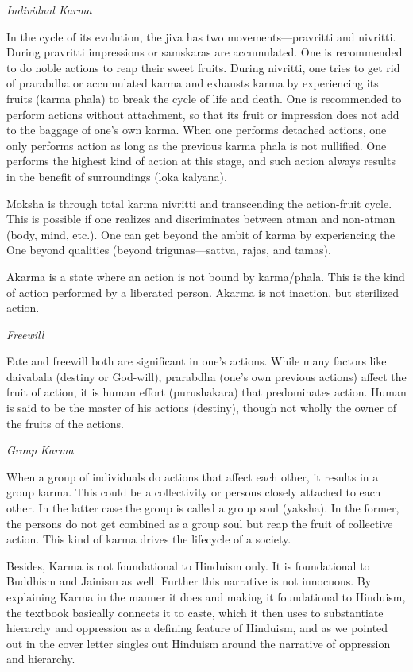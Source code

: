 \noindent
\textit{Individual Karma} 

In the cycle of its evolution, the jiva has two movements—pravritti and nivritti. During pravritti impressions or samskaras are accumulated. One is recommended to do noble actions to reap their sweet fruits. During nivritti, one tries to get rid of prarabdha or accumulated karma and exhausts karma by experiencing its fruits (karma phala) to break the cycle of life and death. One is recommended to perform actions without attachment, so that its fruit or impression does not add to the baggage of one's own karma. When one performs detached actions, one only performs action as long as the previous karma phala is not nullified. One performs the highest kind of action at this stage, and such action always results in the benefit of surroundings (loka kalyana). 

Moksha is through total karma nivritti and transcending the action-fruit cycle. This is possible if one realizes and discriminates between atman and non-atman (body, mind, etc.). One can get beyond the ambit of karma by experiencing the One beyond qualities (beyond trigunas—sattva, rajas, and tamas).

Akarma is a state where an action is not bound by karma/phala. This is the kind of action performed by a liberated person. Akarma is not inaction, but sterilized action.

\noindent
\textit{Freewill} 

Fate and freewill both are significant in one's actions. While many factors like daivabala (destiny or God-will), prarabdha (one's own previous actions) affect the fruit of action, it is human effort (purushakara) that predominates action. Human is said to be the master of his actions (destiny), though not wholly the owner of the fruits of the actions.

\noindent
\textit{Group Karma} 

When a group of individuals do actions that affect each other, it results in a group karma. This could be a collectivity or persons closely attached to each other. In the latter case the group is called a group soul (yaksha). In the former, the persons do not get combined as a group soul but reap the fruit of collective action. This kind of karma drives the lifecycle of a society.

Besides, Karma is not foundational to Hinduism only. It is foundational to Buddhism and Jainism as well. Further this narrative is not innocuous. By explaining Karma in the manner it does and making it foundational to Hinduism, the textbook basically connects it to caste, which it then uses to substantiate hierarchy and oppression as a defining feature of Hinduism, and as we pointed out in the cover letter singles out Hinduism around the narrative of oppression and hierarchy.

